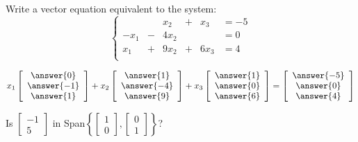 \documentclass{ximera}
\begin{document}
  	\begin{question}
  		Write a vector equation equivalent to the system:
  			$$\left\{
  			\begin{array}{rrrrrl}
  			&&x_2&+&x_3 &=-5 \\
  			-x_1& -&4x_2 &&&=0\\
  			x_1&+&9x_2&+&6x_3 &= 4\\
  			\end{array} \right.$$
  		
  	$x_1\left[\begin{array}{c}
  		\answer{0}\\\answer{-1}\\\answer{1}
  		\end{array}\right] +x_2 \left[\begin{array}{c}
  		\answer{1}\\\answer{-4}\\\answer{9}
  	\end{array}\right]+x_3\left[\begin{array}{c}
  		\answer{1}\\\answer{0}\\\answer{6}
  	\end{array}\right] =\left[\begin{array}{c}
  		\answer{-5}\\\answer{0}\\\answer{4}
  		\end{array}\right]$
  			
  			\end{question}
  			
  			 	\begin{question}
  			 		Is $\begin{bmatrix} -1\\5\end{bmatrix}$ in Span$\left\{  \begin{bmatrix} 1\\0\end{bmatrix}, \begin{bmatrix} 0\\1\end{bmatrix}   \right\}$?
  			 		\begin{multipleChoice}
  			 		\end{multipleChoice}
  			 		
  			 	\end{question}
  	
  	
\end{document}
